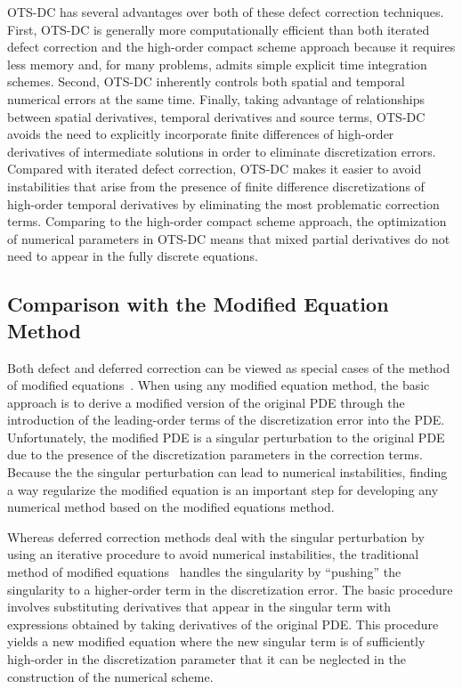 \documentclass[fleqn,12pt,twoside]{article}
\begin{document}
OTS-DC has several advantages over both of these defect correction 
techniques.  First, OTS-DC is generally more computationally efficient than 
both iterated defect correction and the high-order compact scheme approach
because it requires less memory and, for many problems, admits simple 
explicit time integration schemes.  Second, OTS-DC inherently controls both 
spatial and temporal numerical errors at the same time.  Finally, taking
advantage of relationships between spatial derivatives, temporal derivatives
and source terms, OTS-DC avoids the need to explicitly incorporate finite
differences of high-order derivatives of intermediate solutions in order to
eliminate discretization errors. 
Compared with iterated defect correction, OTS-DC makes it easier to avoid
instabilities that arise from the presence of finite difference discretizations
of high-order temporal derivatives by eliminating the most problematic
correction terms.  Comparing to the high-order compact scheme approach, the
optimization of numerical parameters in OTS-DC means that mixed partial
derivatives do not need to appear in the fully discrete equations.


\subsection{Comparison with the Modified Equation Method}
Both defect and deferred correction can be viewed as special cases of the
method of modified equations~\cite{griffiths_1986}.  When using any modified
equation method, the basic approach is to derive a modified version of the 
original PDE through the introduction of the leading-order terms of the
discretization error into the PDE.  Unfortunately, the modified PDE is a
singular perturbation to the original PDE due to the presence of the
discretization parameters in the correction terms.  Because the the singular
perturbation can lead to numerical instabilities, finding a way regularize
the modified equation is an important step for developing any numerical method
based on the modified equations method. 

Whereas deferred correction methods deal with the singular perturbation by
using an iterative procedure to avoid numerical instabilities, the traditional
method of modified equations~\cite{griffiths_1986} handles the
singularity by ``pushing'' the singularity to a higher-order term in the
discretization error.  The basic procedure involves substituting derivatives
that appear in the singular term with expressions obtained by taking
derivatives of the original PDE.  This procedure yields a new modified
equation where the new singular term is of sufficiently high-order in the
discretization parameter that it can be neglected in the construction of the
numerical scheme.
\end{document}
